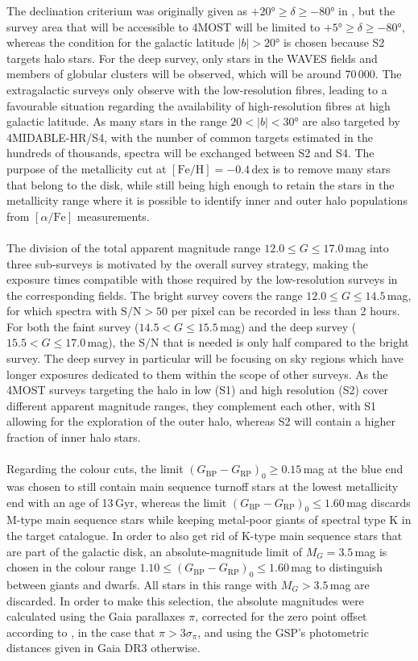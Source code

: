 \documentclass[a4paper,11pt]{article}
\begin{document}
The declination criterium was originally given as $+20$°$\geq\delta\geq-80$° in \citet{4mosts219}, but the survey area that will be accessible to 4MOST will be limited to $+5$°$\geq\delta\geq-80$°, whereas the condition for the galactic latitude $|b|>20$° is chosen because S2 targets halo stars. For the deep survey, only stars in the WAVES fields \citep{4mosts7} and members of globular clusters will be observed, which will be around 70\,000. The extragalactic surveys only observe with the low-resolution fibres, leading to a favourable situation regarding the availability of high-resolution fibres at high galactic latitude. As many stars in the range $20<|b|<30$° are also targeted by 4MIDABLE-HR/S4, with the number of common targets estimated in the hundreds of thousands, spectra will be exchanged between S2 and S4. The purpose of the metallicity cut at $\mathrm{[Fe/H]}=-0.4$\,dex is to remove many stars that belong to the disk, while still being high enough to retain the stars in the metallicity range where it is possible to identify inner and outer halo populations from $[\alpha/\mathrm{Fe}]$ measurements.\\ \\
%
The division of the total apparent magnitude range $12.0\leq G\leq17.0$\,mag into three sub-surveys is motivated by the overall survey strategy, making the exposure times compatible with those required by the low-resolution surveys in the corresponding fields. The bright survey covers the range $12.0\leq G\leq14.5$\,mag, for which spectra with $\mathrm{S/N}>50$ per pixel can be recorded in less than 2 hours. For both the faint survey ($14.5<G\leq15.5$\,mag) and the deep survey ($15.5<G\leq17.0$\,mag), the $\mathrm{S/N}$ that is needed is only half compared to the bright survey. The deep survey in particular will be focusing on sky regions which have longer exposures dedicated to them within the scope of other surveys. As the 4MOST surveys targeting the halo in low (S1) and high resolution (S2) cover different apparent magnitude ranges, they complement each other, with S1 allowing for the exploration of the outer halo, whereas S2 will contain a higher fraction of inner halo stars.\\ \\
%
Regarding the colour cuts, the limit $(G_\mathrm{BP}-G_\mathrm{RP})_0\geq0.15$\,mag at the blue end was chosen to still contain main sequence turnoff stars at the lowest metallicity end with an age of 13\,Gyr, whereas the limit $(G_\mathrm{BP}-G_\mathrm{RP})_0\leq1.60$\,mag discards M-type main sequence stars while keeping metal-poor giants of spectral type K in the target catalogue. In order to also get rid of K-type main sequence stars that are part of the galactic disk, an absolute-magnitude limit of $M_G=3.5$\,mag is chosen in the colour range $1.10\leq(G_\mathrm{BP}-G_\mathrm{RP})_0\leq1.60$\,mag to distinguish between giants and dwarfs. All stars in this range with $M_G>3.5$\,mag are discarded. In order to make this selection, the absolute magnitudes were calculated using the Gaia parallaxes $\pi$, corrected for the zero point offset according to \citet{lindegren21b}, in the case that $\pi>3\sigma_\pi$, and using the GSP's photometric distances given in Gaia DR3 otherwise.\\ \\
\end{document}
